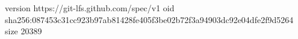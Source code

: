 version https://git-lfs.github.com/spec/v1
oid sha256:087453c31cc923b97ab81428fe405f3be02b72f3a94903dc92e04dfe2f9d5264
size 20389
